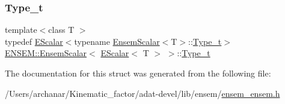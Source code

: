 \subsubsection{\texorpdfstring{Type\_t}{Type\_t}\hspace{0.1cm}{\footnotesize\ttfamily [3/3]}}
{\footnotesize\ttfamily template$<$class T $>$ \\
typedef \mbox{\hyperlink{classENSEM_1_1EScalar}{E\+Scalar}}$<$typename \mbox{\hyperlink{structENSEM_1_1EnsemScalar}{Ensem\+Scalar}}$<$T$>$\+::\mbox{\hyperlink{structENSEM_1_1EnsemScalar_3_01EScalar_3_01T_01_4_01_4_a1c2a1f5745c75b422ce4629dcc4d98c9}{Type\+\_\+t}}$>$ \mbox{\hyperlink{structENSEM_1_1EnsemScalar}{E\+N\+S\+E\+M\+::\+Ensem\+Scalar}}$<$ \mbox{\hyperlink{classENSEM_1_1EScalar}{E\+Scalar}}$<$ T $>$ $>$\+::\mbox{\hyperlink{structENSEM_1_1EnsemScalar_3_01EScalar_3_01T_01_4_01_4_a1c2a1f5745c75b422ce4629dcc4d98c9}{Type\+\_\+t}}}



The documentation for this struct was generated from the following file\+:\begin{DoxyCompactItemize}
\item 
/\+Users/archanar/\+Kinematic\+\_\+factor/adat-\/devel/lib/ensem/\mbox{\hyperlink{adat-devel_2lib_2ensem_2ensem__ensem_8h}{ensem\+\_\+ensem.\+h}}\end{DoxyCompactItemize}
